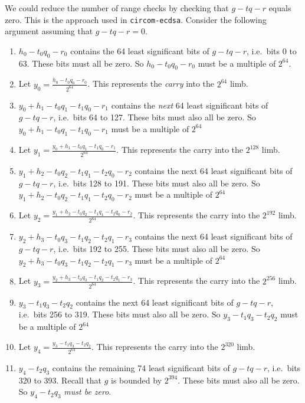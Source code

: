 \documentclass[a4paper, 12pt]{article}
\begin{document}
We could reduce the number of range checks by checking that $g-tq-r$ equals zero. This is the approach used in \texttt{circom-ecdsa}. Consider the following argument assuming that $g-tq-r = 0$.
\begin{enumerate}
  \item $h_0-t_0q_0-r_0$ contains the 64 least significant bits of $g-tq-r$, i.e.~bits 0 to 63. These bits must all be zero. So $h_0-t_0q_0-r_0$ must be a multiple of $2^{64}$. 
  \item Let $y_0 = \frac{h_0-t_0q_0-r_0}{2^{64}}$. This represents the \textit{carry} into the $2^{64}$ limb.
  \item $y_0+h_1-t_0q_1-t_1q_0-r_1$ contains the \textit{next} 64 least significant bits of $g-tq-r$, i.e.~bits 64 to 127. These bits must also all be zero. So $y_0+h_1-t_0q_1-t_1q_0-r_1$ must be a multiple of $2^{64}$
  \item Let $y_1 = \frac{y_0+h_1-t_0q_1-t_1q_0-r_1}{2^{64}}$. This represents the carry into the $2^{128}$ limb.
  \item $y_1+h_2-t_0q_2-t_1q_1-t_2q_0-r_2$ contains the next 64 least significant bits of $g-tq-r$, i.e.~bits 128 to 191. These bits must also all be zero. So $y_1+h_2-t_0q_2-t_1q_1-t_2q_0-r_2$ must be a multiple of $2^{64}$
  \item Let $y_2 = \frac{y_1+h_2-t_0q_2-t_1q_1-t_2q_0-r_2}{2^{64}}$. This represents the carry into the $2^{192}$ limb.
  \item $y_2+h_3-t_0q_3-t_1q_2-t_2q_1-r_3$ contains the next 64 least significant bits of $g-tq-r$, i.e.~bits 192 to 255. These bits must also all be zero. So $y_2+h_3-t_0q_3-t_1q_2-t_2q_1-r_3$ must be a multiple of $2^{64}$
  \item Let $y_3 = \frac{y_2+h_3-t_0q_3-t_1q_2-t_2q_1-r_3}{2^{64}}$. This represents the carry into the $2^{256}$ limb.
  \item $y_3-t_1q_3-t_2q_2$ contains the next 64 least significant bits of $g-tq-r$, i.e.~bits 256 to 319. These bits must also all be zero. So $y_3-t_1q_3-t_2q_2$ must be a multiple of $2^{64}$
  \item Let $y_4 = \frac{y_3-t_1q_3-t_2q_2}{2^{64}}$. This represents the carry into the $2^{320}$ limb.
  \item $y_4-t_2q_3$ contains the remaining 74 least significant bits of $g-tq-r$, i.e.~bits 320 to 393. Recall that $g$ is bounded by $2^{394}$. These bits must also all be zero. So $y_4-t_2q_3$ \textit{must be zero}.
\end{enumerate}
\end{document}
